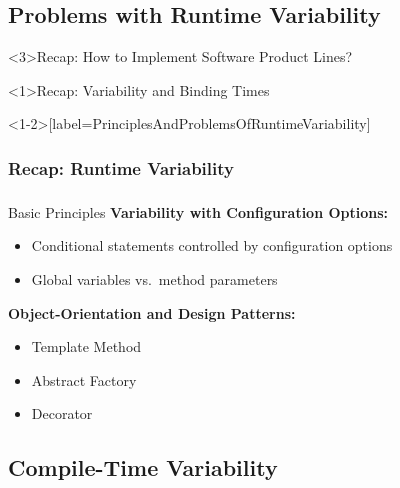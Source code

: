 \subsection{Problems with Runtime Variability}

\begin{frame}<3>{Recap: How to Implement Software Product Lines?}
	\frameImplementSPLs
\end{frame}

\begin{frame}<1>{Recap: Variability and Binding Times}
	\frameVariabilityAndBindingTimes
\end{frame}

\begin{frame}<1-2>[label=PrinciplesAndProblemsOfRuntimeVariability]
	\frametitle<1-2>{Recap: Runtime Variability}
	\frametitle<3>{\myframetitle}
	\begin{fancycolumns}[t]
		\begin{note}{Basic Principles}
			{\bf Variability with Configuration Options:}
			\begin{itemize}
				\item Conditional statements controlled by configuration options
				\item Global variables vs.\ method parameters
			\end{itemize}
			{\bf Object-Orientation and Design Patterns:}
			\begin{itemize}
				\item Template Method
				\item Abstract Factory
				\item Decorator
			\end{itemize}	
		\end{note}
	\nextcolumn
		\frameRuntimeVariabilityProblems
	\end{fancycolumns}	
\end{frame}

\subsection{Compile-Time Variability}

